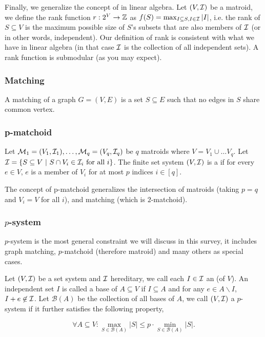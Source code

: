Finally, we generalize the concept of  in linear algebra. Let $(V, \mathcal{I})$ be a matroid, we define the rank function $r: 2^V \rightarrow \mathbb{Z}$ as $f(S) = \max_{I\subseteq S, I\in \mathcal{I}} |I|$, i.e. the rank of $S\subseteq V$ is the maximum possible size of $S$'s subsets that are also members of $\mathcal{I}$ (or in other words, independent). Our definition of rank is consistent with what we have in linear algebra (in that case $\mathcal{I}$ is the collection of all independent sets). A rank function is submodular (as you may expect).


\subsubsection{Matching}
A matching of a graph $G = (V, E)$ is a set  $S\subseteq E$ such that no edges in $S$ share common vertex. 



\subsubsection{p-matchoid}
Let $\mathcal{M}_1 = (V_1, \mathcal{I}_1),\ldots, \mathcal{M}_q = (V_q, \mathcal{I}_q)$ be $q$ matroids where $V = V_1\cup\ldots V_q$. Let $\mathcal{I} = \{S\subseteq V~|~ S\cap V_i \in \mathcal{I}_i ~\text{for all}~ i\}$. The finite set system $(V, \mathcal{I})$ is a  if for every $e\in V$, $e$ is a member of $V_i$ for at most $p$ indices $i \in [q]$. 

The concept of p-matchoid generalizes the intersection of matroids (taking $p = q$ and $V_i = V$ for all $i$), and matching (which is $2$-matchoid). 




\subsubsection{$p$-system}
$p$-system is the most general constraint we will discuss in this survey, it includes graph matching, $p$-matchoid (therefore matroid) and many others as special cases.

Let $(V, \mathcal{I})$ be a set system and $\mathcal{I}$ hereditary, we call each $I \in\mathcal{I}$ an  (of $V$). An independent set $I$ is called a base of $A \subseteq V$ if $I\subseteq A$ and for any $e \in A\backslash I$, $I + e\not\in \mathcal{I}$.  Let $\mathcal{B}(A)$ be the collection of all bases of $A$, we call $(V, \mathcal{I})$ a $p$-system if it further satisfies the following property,

$$\forall A\subseteq V: \max_{S\in\mathcal{B}(A)}|S| \leq p\cdot \min_{S\in\mathcal{B}(A)}|S|.$$

